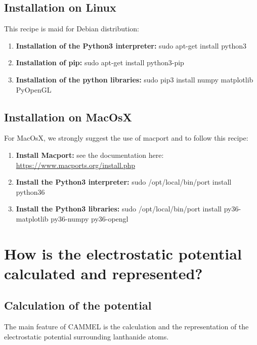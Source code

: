 \documentclass[12pt,a4paper]{article}
\begin{document}
\subsection{Installation on Linux}
This recipe is maid for Debian distribution:
\begin{enumerate}
\item{\textbf{Installation of the Python3 interpreter:} sudo apt-get install python3}
\item{\textbf{Installation of pip:} sudo apt-get install python3-pip}
\item{\textbf{Installation of the python libraries:} sudo pip3 install numpy matplotlib PyOpenGL}
\end{enumerate}

\subsection{Installation on MacOsX}
For MacOsX, we strongly suggest the use of macport and to follow this recipe:
\begin{enumerate}
\item{\textbf{Install Macport:} see the documentation here: \href{https://www.macports.org/install.php}{https://www.macports.org/install.php}}
\item{\textbf{Install the Python3 interpreter:} sudo /opt/local/bin/port install python36}
\item{\textbf{Install the Python3 libraries:} sudo /opt/local/bin/port install py36-matplotlib py36-numpy py36-opengl}
\end{enumerate}

\section{How is the electrostatic potential calculated and represented?}
\subsection{Calculation of the potential}
The main feature of CAMMEL is the calculation and the representation of the electrostatic potential surrounding lanthanide atoms.\\
\end{document}
